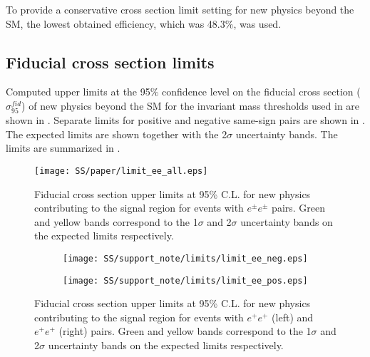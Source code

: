 To provide a conservative cross section limit setting for new physics beyond the SM, the lowest obtained efficiency, which was 48.3$\%$, was used.

\subsection{Fiducial cross section limits}

Computed upper limits at the 95$\%$ confidence level on the fiducial cross section ($\sigma_{95}^{fid}$)
of new physics beyond the SM for the invariant mass thresholds used in 
are shown in . Separate limits for positive and negative same-sign pairs are shown in .
The expected limits are shown together with the 2$\sigma$ uncertainty bands. The limits are summarized in .

\begin{figure}[h]
\begin{center}
\texttt{[image: SS/paper/limit\_ee\_all.eps]}
\caption{Fiducial cross section upper limits at 95\% C.L. for new physics contributing to the signal region for events with $e^{\pm}e^{\pm}$ pairs.
Green and yellow bands correspond to the 1$\sigma$ and 2$\sigma$ uncertainty bands on the expected limits respectively.}
\label{fig:inclusive_fid_limit}
\end{center}
\end{figure}


\begin{figure}
\begin{subfigure}{.5\textwidth}
  \centering
  \texttt{[image: SS/support\_note/limits/limit\_ee\_neg.eps]}
\end{subfigure}%
\begin{subfigure}{.5\textwidth}
  \centering
  \texttt{[image: SS/support\_note/limits/limit\_ee\_pos.eps]}
\end{subfigure}
\caption{Fiducial cross section upper limits at 95\% C.L. for new physics contributing to the signal region
for events with $e^{+}e^{+}$ (left) and $e^{+}e^{+}$ (right) pairs. Green and yellow bands correspond to the 1$\sigma$ and 2$\sigma$ uncertainty bands on the expected limits respectively.}
  \label{fig:signal_kinematics_v2}
\end{figure}


